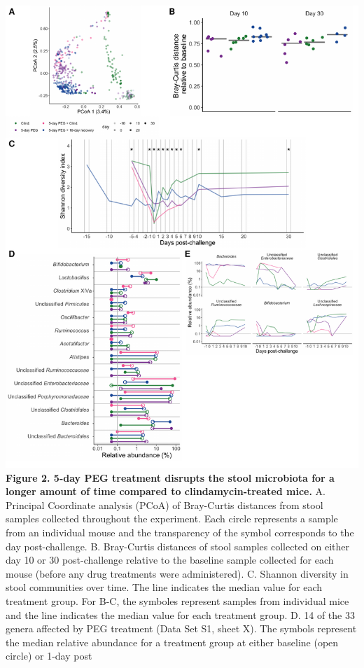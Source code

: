 \documentclass[
  11pt,
]{article}
\begin{document}
\includegraphics{figure_2.pdf} \textbf{Figure 2. 5-day PEG treatment
disrupts the stool microbiota for a longer amount of time compared to
clindamycin-treated mice.} A. Principal Coordinate analysis (PCoA) of
Bray-Curtis distances from stool samples collected throughout the
experiment. Each circle represents a sample from an individual mouse and
the transparency of the symbol corresponds to the day post-challenge. B.
Bray-Curtis distances of stool samples collected on either day 10 or 30
post-challenge relative to the baseline sample collected for each mouse
(before any drug treatments were administered). C. Shannon diversity in
stool communities over time. The line indicates the median value for
each treatment group. For B-C, the symboles represent samples from
individual mice and the line indicates the median value for each
treatment group. D. 14 of the 33 genera affected by PEG treatment (Data
Set S1, sheet X). The symbols represent the median relative abundance
for a treatment group at either baseline (open circle) or 1-day post
\end{document}

